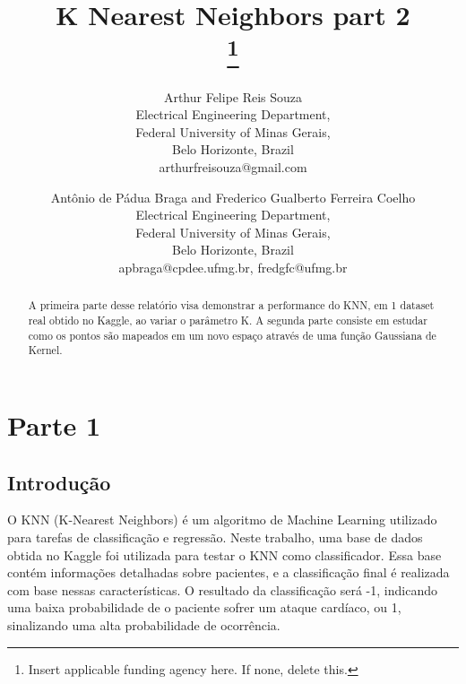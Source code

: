\documentclass{article} %
\begin{document}
\title{K Nearest Neighbors part 2\\
\thanks{Insert applicable funding agency here. If none, delete this.}
}

\author{Arthur Felipe Reis Souza \\
Electrical Engineering Department, \\
Federal University of Minas Gerais, \\
Belo Horizonte, Brazil \\
arthurfreisouza@gmail.com \\
\and
Antônio de Pádua Braga and Frederico Gualberto Ferreira Coelho \\
Electrical Engineering Department, \\
Federal University of Minas Gerais, \\
Belo Horizonte, Brazil \\
apbraga@cpdee.ufmg.br, fredgfc@ufmg.br
}

\maketitle

\begin{abstract}

    A primeira parte desse relatório visa demonstrar a performance do KNN, em 1 dataset real obtido no Kaggle, ao variar o parâmetro K. A segunda parte consiste em estudar como os pontos são mapeados em um novo espaço através de uma função Gaussiana de Kernel.

\end{abstract}

\newpage

\section{Parte 1}

\subsection{Introdução}

O KNN (K-Nearest Neighbors) é um algoritmo de Machine Learning utilizado para tarefas de classificação e regressão. Neste trabalho, uma base de dados obtida no Kaggle foi utilizada para testar o KNN como classificador. Essa base contém informações detalhadas sobre pacientes, e a classificação final é realizada com base nessas características. O resultado da classificação será -1, indicando uma baixa probabilidade de o paciente sofrer um ataque cardíaco, ou 1, sinalizando uma alta probabilidade de ocorrência.
\end{document}
